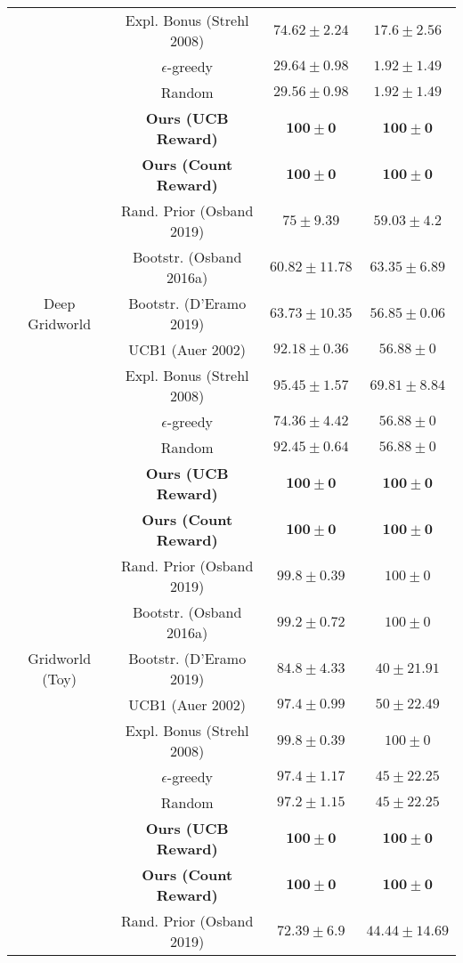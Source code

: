 \documentclass{article}
\begin{document}
\begin{table}
\begin{tabular}{ c | c | c c }
	& Expl. Bonus (Strehl 2008) & $74.62 \pm 2.24$ & $17.6 \pm 2.56$ \\
	& $\epsilon$-greedy & $29.64 \pm 0.98$ & $1.92 \pm 1.49$ \\
	& Random & $29.56 \pm 0.98$ & $1.92 \pm 1.49$ \\
	 \hline
	 & \textbf{Ours (UCB Reward)} & $\mathbf{100 \pm 0}$ & $\mathbf{100 \pm 0}$ \\
	 & \textbf{Ours (Count Reward)} & $\mathbf{100 \pm 0}$ & $\mathbf{100 \pm 0}$ \\
	 & Rand. Prior (Osband 2019) & $75 \pm 9.39$ & $59.03 \pm 4.2$ \\
	 & Bootstr. (Osband 2016a) & $60.82 \pm 11.78$ & $63.35 \pm 6.89$ \\
	 Deep Gridworld & Bootstr. (D'Eramo 2019) & $63.73 \pm 10.35$ & $56.85 \pm 0.06$ \\
 & UCB1 (Auer 2002) & $92.18 \pm 0.36$ & $56.88 \pm 0$ \\
	 & Expl. Bonus (Strehl 2008) & $95.45 \pm 1.57$ & $69.81 \pm 8.84$ \\
	 & $\epsilon$-greedy & $74.36 \pm 4.42$ & $56.88 \pm 0$ \\
	 & Random & $92.45 \pm 0.64$ & $56.88 \pm 0$ \\
	 \hline
	 & \textbf{Ours (UCB Reward)} & $\mathbf{100 \pm 0}$ & $\mathbf{100 \pm 0}$ \\
	 & \textbf{Ours (Count Reward)} & $\mathbf{100 \pm 0}$ & $\mathbf{100 \pm 0}$ \\
	 & Rand. Prior (Osband 2019) & $99.8 \pm 0.39$ & $100 \pm 0$ \\
	 & Bootstr. (Osband 2016a) & $99.2 \pm 0.72$ & $100 \pm 0$ \\
	 Gridworld (Toy) & Bootstr. (D'Eramo 2019) & $84.8 \pm 4.33$ & $40 \pm 21.91$ \\
	 & UCB1 (Auer 2002) & $97.4 \pm 0.99$ & $50 \pm 22.49$ \\
	 & Expl. Bonus (Strehl 2008) & $99.8 \pm 0.39$ & $100 \pm 0$ \\
	 & $\epsilon$-greedy & $97.4 \pm 1.17$ & $45 \pm 22.25$ \\
	 & Random & $97.2 \pm 1.15$ & $45 \pm 22.25$ \\
	 \hline
	 & \textbf{Ours (UCB Reward)} & $\mathbf{100 \pm 0}$ & $\mathbf{100 \pm 0}$ \\
	 & \textbf{Ours (Count Reward)} & $\mathbf{100 \pm 0}$ & $\mathbf{100 \pm 0}$ \\
	 & Rand. Prior (Osband 2019) & $72.39 \pm 6.9$ & $44.44 \pm 14.69$ \\

\end{tabular}
\end{table}
\end{document}
